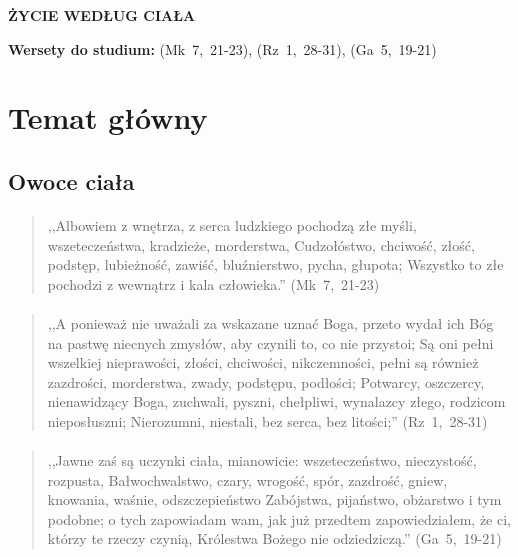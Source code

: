 \documentclass[10pt,a4paper,oneside]{article}
\begin{document}
\centerline{\textbf{\MakeUppercase{Życie według ciała}}}
\begin{center}
\textbf{Wersety do studium:} \mbox{(Mk 7, 21-23)}, \mbox{(Rz 1, 28-31)}, \mbox{(Ga 5, 19-21)}
\end{center}
\section{Temat główny}
\subsection{Owoce ciała}
\paragraph{}
\begin{quote}
,,Albowiem z wnętrza, z serca ludzkiego pochodzą złe myśli, wszeteczeństwa, kradzieże, morderstwa, Cudzołóstwo, chciwość, złość, podstęp, lubieżność, zawiść, bluźnierstwo, pycha, głupota; Wszystko to złe pochodzi z wewnątrz i kala człowieka.'' \mbox{(Mk 7, 21-23)}
\end{quote}
\paragraph{}
\begin{quote}
,,A ponieważ nie uważali za wskazane uznać Boga, przeto wydał ich Bóg na pastwę niecnych zmysłów, aby czynili to, co nie przystoi; Są oni pełni wszelkiej nieprawości, złości, chciwości, nikczemności, pełni są również zazdrości, morderstwa, zwady, podstępu, podłości; Potwarcy, oszczercy, nienawidzący Boga, zuchwali, pyszni, chełpliwi, wynalazcy złego, rodzicom nieposłuszni; Nierozumni, niestali, bez serca, bez litości;'' \mbox{(Rz 1, 28-31)}
\end{quote}
\paragraph{}
\begin{quote}
,,Jawne zaś są uczynki ciała, mianowicie: wszeteczeństwo, nieczystość, rozpusta, Bałwochwalstwo, czary, wrogość, spór, zazdrość, gniew, knowania, waśnie, odszczepieństwo Zabójstwa, pijaństwo, obżarstwo i tym podobne; o tych zapowiadam wam, jak już przedtem zapowiedziałem, że ci, którzy te rzeczy czynią, Królestwa Bożego nie odziedziczą.'' \mbox{(Ga 5, 19-21)}
\end{quote}
\end{document}
